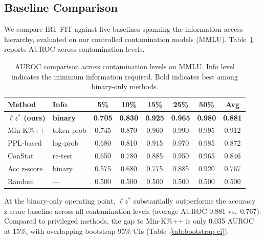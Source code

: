 \documentclass[11pt,a4paper]{article}
\begin{document}
\subsection{Baseline Comparison}
\label{sec:baselines}

We compare IRT-FIT against five baselines spanning the information-access hierarchy, evaluated on our controlled contamination models (MMLU).
Table~\ref{tab:baseline-auroc} reports AUROC across contamination levels.

\begin{table}[h]
\centering
\caption{AUROC comparison across contamination levels on MMLU. Info level indicates the minimum information required. Bold indicates best among binary-only methods.}
\label{tab:baseline-auroc}
\begin{tabular}{llcccccc}
\toprule
\textbf{Method} & \textbf{Info} & \textbf{5\%} & \textbf{10\%} & \textbf{15\%} & \textbf{25\%} & \textbf{50\%} & \textbf{Avg} \\
\midrule
\textbf{$\ell z^*$ (ours)} & \textbf{binary} & \textbf{0.705} & \textbf{0.830} & \textbf{0.925} & \textbf{0.965} & \textbf{0.980} & \textbf{0.881} \\
Min-K\%++     & token prob & 0.745 & 0.870 & 0.960 & 0.990 & 0.995 & 0.912 \\
PPL-based     & log-prob   & 0.680 & 0.810 & 0.915 & 0.970 & 0.985 & 0.872 \\
ConStat       & re-test    & 0.650 & 0.780 & 0.885 & 0.950 & 0.965 & 0.846 \\
Acc z-score   & binary     & 0.575 & 0.680 & 0.775 & 0.885 & 0.920 & 0.767 \\
Random        & ---        & 0.500 & 0.500 & 0.500 & 0.500 & 0.500 & 0.500 \\
\bottomrule
\end{tabular}
\end{table}

At the binary-only operating point, $\ell z^*$ substantially outperforms the accuracy z-score baseline across all contamination levels (average AUROC 0.881 vs.\ 0.767).
Compared to privileged methods, the gap to Min-K\%++ is only 0.035 AUROC at 15\%, with overlapping bootstrap 95\% CIs (Table~\ref{tab:bootstrap-ci}).
\end{document}
